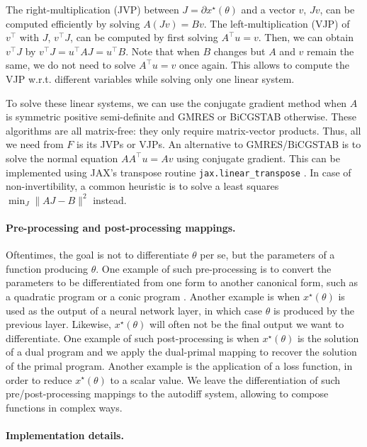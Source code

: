 \documentclass{article}
\begin{document}
The right-multiplication (JVP) between $J = \partial x^\star(\theta)$ and a
vector $v$, $Jv$, can be computed efficiently by solving $A (Jv) = Bv$. 
The left-multiplication (VJP) of $v^\top$ with $J$,
$v^\top J$, can be computed by first solving $A^\top u = v$. Then, we can obtain
$v^\top J$ by $v^\top J = u^\top A J = u^\top B$. 
Note that when $B$ changes but $A$ and $v$ remain the same, we
do not need to solve $A^\top u = v$ once again. This allows to compute the VJP
w.r.t. different variables while solving only one linear system.

To solve these linear systems, we can use the conjugate gradient method
\cite{conjugate_gradient} when $A$ is symmetric positive semi-definite and GMRES
\cite{saad_1986} or BiCGSTAB \cite{Vorst1992-bicgstab} otherwise. These
algorithms are all matrix-free: they only require matrix-vector products.  Thus,
all we need from $F$ is its JVPs or VJPs.  An alternative to GMRES/BiCGSTAB is
to solve the normal equation $A A^\top u = A v$ using conjugate gradient.  This
can be
implemented using JAX's transpose routine
\texttt{jax.linear\_transpose} \cite{frostig2021decomposing}.
In case of non-invertibility, a common heuristic is to solve a least
squares $\min_J \|AJ-B\|^2$ instead.

\paragraph{Pre-processing and post-processing mappings.}

Oftentimes, the goal is not to differentiate $\theta$ per se, but the
parameters of a function producing $\theta$. One example of such pre-processing
is to convert the parameters to be differentiated from one form to another
canonical form, such as a quadratic program \cite{amos_2017} or a conic program
\cite{agrawal_2019}. 
Another example
is when $x^\star(\theta)$ is used as the output of a neural network layer, in
which case $\theta$ is produced by the previous layer. Likewise,
$x^\star(\theta)$ will often not be the final output we want to differentiate.
One example of such post-processing is when $x^\star(\theta)$ is the solution of
a dual program and we apply the dual-primal mapping to recover the solution of
the primal program.  Another example is the application of a loss function, in
order to reduce $x^\star(\theta)$ to a scalar value. We leave the
differentiation of such pre/post-processing mappings to the autodiff system,
allowing to compose functions in complex ways.

\paragraph{Implementation details.}
\end{document}
